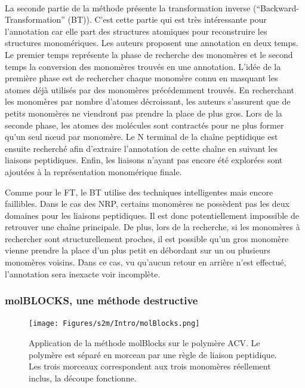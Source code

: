 \documentclass[12pt,french,twoside]{report}
\begin{document}
\paragraph{}La seconde partie de la méthode présente la transformation inverse (``Backward-Transformation'' (BT)).
C'est cette partie qui est très intéressante pour l'annotation car elle part des structures atomiques pour reconstruire les structures monomériques.
Les auteurs proposent une annotation en deux temps.
Le premier temps représente la phase de recherche des monomères et le second temps la conversion des monomères trouvés en une annotation.
L'idée de la première phase est de rechercher chaque monomère connu en masquant les atomes déjà utilisés par des monomères précédemment trouvés.
En recherchant les monomères par nombre d'atomes décroissant, les auteurs s'assurent que de petits monomères ne viendront pas prendre la place de plus gros.
Lors de la seconde phase, les atomes des molécules sont contractés pour ne plus former qu'un seul n\oe{}ud par monomère.
Le N terminal de la chaîne peptidique est ensuite recherché afin d'extraire l'annotation de cette chaîne en suivant les liaisons peptidiques.
Enfin, les liaisons n'ayant pas encore été explorées sont ajoutées à la représentation monomérique finale.

Comme pour le FT, le BT utilise des techniques intelligentes mais encore faillibles.
Dans le cas des NRP, certains monomères ne possèdent pas les deux domaines pour les liaisons peptidiques.
Il est donc potentiellement impossible de retrouver une chaîne principale.
De plus, lors de la recherche, si les monomères à rechercher sont structurellement proches, il est possible qu'un gros monomère vienne prendre la place d'un plus petit en débordant sur un ou plusieurs monomères voisins.
Dans ce cas, vu qu'aucun retour en arrière n'est effectué, l'annotation sera inexacte voir incomplète.


\subsubsection{molBLOCKS, une méthode destructive}

\begin{figure}[!ht]
  \begin{center}
    \texttt{[image: Figures/s2m/Intro/molBlocks.png]}
    \caption{\label{molBlocks}Application de la méthode molBlocks sur le polymère ACV.
    Le polymère est séparé en morceau par une règle de liaison peptidique.
    Les trois morceaux correspondent aux trois monomères réellement inclus, la découpe fonctionne.}
  \end{center}
\end{figure}
\end{document}
